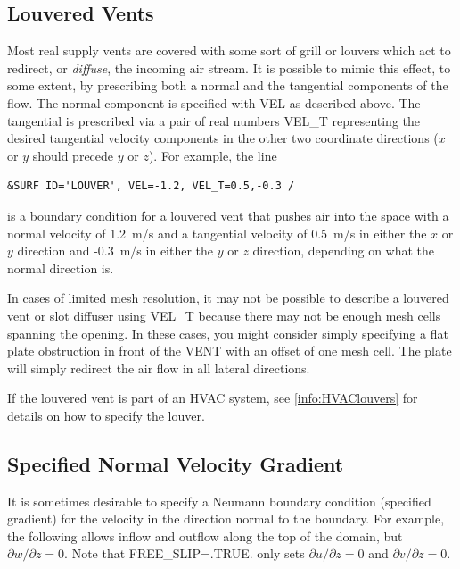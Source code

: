 \documentclass[11pt]{book}
\begin{document}
\subsection{Louvered Vents}

\label{info:louvers}

Most real supply vents are covered with some sort of grill or louvers which act to redirect, or {\em diffuse}, the
incoming air stream.
It is possible to mimic this effect, to some extent, by prescribing both a normal and the tangential components of the flow.
The normal component is specified with {\ct VEL} as described above. The tangential is prescribed
via a pair of real numbers {\ct VEL\_T} representing the desired tangential
velocity components in the other two coordinate directions ($x$ or $y$ should precede $y$ or $z$). For example, the line

\begin{lstlisting}
&SURF ID='LOUVER', VEL=-1.2, VEL_T=0.5,-0.3 /
\end{lstlisting}

\noindent
is a boundary condition for a louvered vent that pushes air into the
space with a normal velocity of 1.2~m/s and a tangential velocity
of 0.5~m/s in either the $x$ or $y$ direction and -0.3~m/s in either
the $y$ or $z$ direction, depending on what the normal direction is.

In cases of limited mesh resolution, it may not be possible to describe a louvered vent or
slot diffuser using {\ct VEL\_T} because there may not be enough mesh cells spanning the
opening. In these cases, you might consider simply specifying a flat plate obstruction in front of the
{\ct VENT} with an offset of one mesh cell. The plate will simply redirect the air flow in all lateral
directions.

If the louvered vent is part of an HVAC system, see \ref{info:HVAClouvers} for details on how to specify the louver.


\subsection{Specified Normal Velocity Gradient}
\label{info:vel_grad}

It is sometimes desirable to specify a Neumann boundary condition (specified gradient) for the velocity in the direction normal to the boundary.  For example, the following allows inflow and outflow along the top of the domain, but $\partial w/\partial z = 0$.  Note that {\ct FREE\_SLIP=.TRUE.} only sets $\partial u/\partial z=0$ and $\partial v/\partial z=0$.
\end{document}
